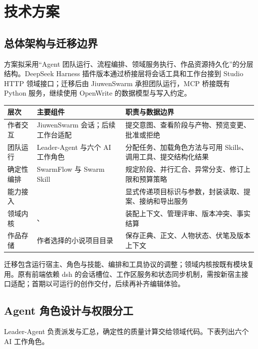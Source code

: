 \section{技术方案}

\subsection{总体架构与迁移边界}

方案拟采用“Agent 团队运行、流程编排、领域服务执行、作品资源持久化”的分层结构。DeepSeek Harness 插件版本通过桥接层将会话工具和工作台接到 Studio HTTP 领域接口；迁移后由 JiuwenSwarm 承担团队运行，MCP 桥接既有 Python 服务，继续使用 OpenWrite 的数据模型与写入约定。

\noindent\begin{tabularx}{\textwidth}{@{}>{\raggedright\arraybackslash}p{}>{\raggedright\arraybackslash}p{}Y@{}}
\toprule
层次 & 主要组件 & 职责与数据边界 \\
\midrule
作者交互 & JiuwenSwarm 会话；后续工作台适配 & 提交意图、查看阶段与产物、预览变更、批准或拒绝 \\
团队运行 & Leader-Agent 与六个 AI 工作角色 & 分配任务、加载角色方法与可用 Skills、调用工具、提交结构化结果 \\
确定性编排 & SwarmFlow 与 Swarm Skill & 规定阶段、并行汇合、异常分支、修订上限和预算策略 \\
能力接入 &  & 显式传递项目标识与参数，封装读取、提案、接纳和导出服务 \\
领域内核 & 、 & 装配上下文、管理评审、版本冲突、事实结算 \\
作品存储 & 作者选择的小说项目目录 & 保存正典、正文、人物状态、伏笔及版本上下文 \\
\bottomrule
\end{tabularx}

迁移包含运行宿主、角色与技能、编排和工具协议的调整；领域内核按既有模块复用。原有前端依赖 dsh 的会话槽位、工作区服务和状态同步机制，需按新宿主接口适配；首期以可运行的创作交付，后续再补齐编辑体验。

\subsection{Agent 角色设计与权限分工}

Leader-Agent 负责派发与汇总，确定性的质量计算交给领域代码。下表列出六个 AI 工作角色。


